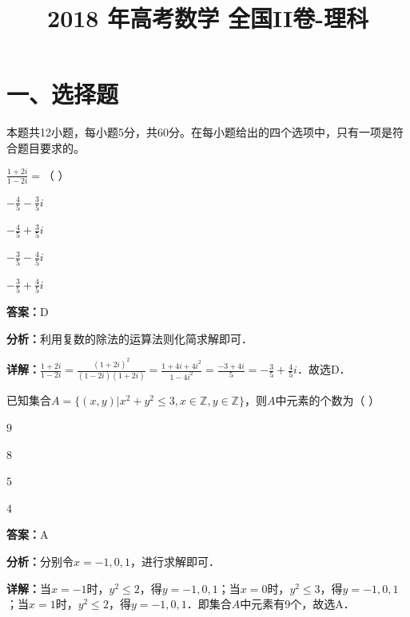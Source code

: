 ﻿\title{2018 年高考数学 全国II卷-理科}
\date{}
\maketitle

\section*{一、选择题}
本题共12小题，每小题5分，共60分。在每小题给出的四个选项中，只有一项是符合题目要求的。

\begin{question}[points=5]
$\frac{1+2i}{1-2i}=$（    ）
\begin{choices}
  \item $-\frac{4}{5}-\frac{3}{5}i$
  \item $-\frac{4}{5}+\frac{3}{5}i$
  \item $-\frac{3}{5}-\frac{4}{5}i$
  \item $-\frac{3}{5}+\frac{4}{5}i$
\end{choices}
\begin{solution}
\textbf{答案：}D

\textbf{分析：}利用复数的除法的运算法则化简求解即可．

\textbf{详解：}$\frac{1+2i}{1-2i}=\frac{(1+2i)^2}{(1-2i)(1+2i)}=\frac{1+4i+4i^2}{1-4i^2}=\frac{-3+4i}{5}=-\frac{3}{5}+\frac{4}{5}i$．故选D．
\end{solution}
\end{question}

\begin{question}[points=5]
已知集合$A=\{(x,y)|x^2+y^2\le 3, x\in \mathbb{Z}, y\in \mathbb{Z}\}$，则$A$中元素的个数为（     ）
\begin{choices}
  \item $9$
  \item $8$
  \item $5$
  \item $4$
\end{choices}
\begin{solution}
\textbf{答案：}A

\textbf{分析：}分别令$x=-1,0,1$，进行求解即可．

\textbf{详解：}当$x=-1$时，$y^2\le 2$，得$y=-1,0,1$；当$x=0$时，$y^2\le 3$，得$y=-1,0,1$；当$x=1$时，$y^2\le 2$，得$y=-1,0,1$．即集合$A$中元素有$9$个，故选A．
\end{solution}
\end{question}

